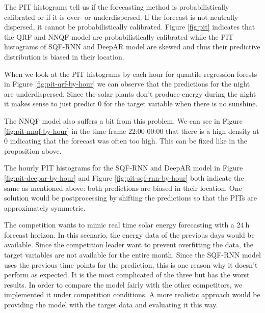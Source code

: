 The PIT histograms tell us if the forecasting method is probabilistically 
calibrated or if it is over- or underdispersed. If the forecast is not neutrally dispersed, 
it cannot be probabilistically calibrated.
Figure \ref{fig:pit} indicates that the QRF and NNQF model are 
probabilistically calibrated while the PIT histograms of SQF-RNN 
and DeepAR model are skewed and thus their predictive distribution is 
biased in their location.

When we look at the PIT histograms by each hour 
for quantile regression forests in Figure \ref{fig:pit-qrf-by-hour} 
we can observe that the predictions for the night are underdispersed. 
Since the solar plants don't produce energy during the night 
it makes sense to just predict \(0\) for the target variable when there is 
no sunshine.

The NNQF model also suffers a bit from this problem. We can see 
in Figure \ref{fig:pit-nnqf-by-hour} in the time frame 22:00-00:00 that 
there is a high density at \(0\) indicating that the forecast 
was often too high. This can be fixed like in the proposition above.

The hourly PIT histograms for the SQF-RNN and DeepAR model in 
Figure \ref{fig:pit-deepar-by-hour} and Figure \ref{fig:pit-sqf-rnn-by-hour} 
both indicate the same as mentioned above: both predictions are biased 
in their location. One solution would be postprocessing by shifting the 
predictions so that the PITs are approximately symmetric. 

The competition wants to mimic real time solar energy forecasting with 
a \(\SI{24}{\hour}\) forecast horizon. In this scenario, the energy data of 
the previous days would be available. Since the competition leader want to 
prevent overfitting the data, the target variables are not available for 
the entire month. Since the SQF-RNN model uses the previous time points for the prediction, 
this is one reason why it doesn't perform as expected. 
It is the most complicated of the three but has the worst results. 
In order to compare the model fairly with the other competitors, 
we implemented it under competition conditions. A more realistic approach would be 
providing the model with the target data and evaluating it this way.